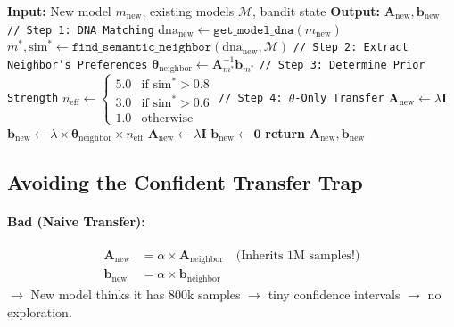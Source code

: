 \documentclass[sigconf]{acmart}
\begin{document}
\begin{algorithm}[h]
\caption{Layer 2: Semantic Transfer}
\label{alg:semantic_transfer}
\begin{algorithmic}[1]
\STATE \textbf{Input:} New model $m_{\text{new}}$, existing models $\mathcal{M}$, bandit state
\STATE \textbf{Output:} $\mathbf{A}_{\text{new}}, \mathbf{b}_{\text{new}}$
\STATE
\STATE \texttt{// Step 1: DNA Matching}
\STATE $\text{dna}_{\text{new}} \leftarrow \texttt{get\_model\_dna}(m_{\text{new}})$
\STATE $m^*, \text{sim}^* \leftarrow \texttt{find\_semantic\_neighbor}(\text{dna}_{\text{new}}, \mathcal{M})$
\STATE
{} 
    \STATE \texttt{// Step 2: Extract Neighbor's Preferences}
    \STATE $\boldsymbol{\theta}_{\text{neighbor}} \leftarrow \mathbf{A}_{m^*}^{-1} \mathbf{b}_{m^*}$
    \STATE
    \STATE \texttt{// Step 3: Determine Prior Strength}
    \STATE $n_{\text{eff}} \leftarrow \begin{cases}
        5.0 & \text{if } \text{sim}^* > 0.8 \\
        3.0 & \text{if } \text{sim}^* > 0.6 \\
        1.0 & \text{otherwise}
    \end{cases}$
    \STATE
    \STATE \texttt{// Step 4: $\theta$-Only Transfer}
    \STATE $\mathbf{A}_{\text{new}} \leftarrow \lambda \mathbf{I}$ 
    \STATE $\mathbf{b}_{\text{new}} \leftarrow \lambda \times \boldsymbol{\theta}_{\text{neighbor}} \times n_{\text{eff}}$ 
\ELSE
    \STATE $\mathbf{A}_{\text{new}} \leftarrow \lambda \mathbf{I}$ 
    \STATE $\mathbf{b}_{\text{new}} \leftarrow \mathbf{0}$ 
\ENDIF
\STATE
\STATE \textbf{return} $\mathbf{A}_{\text{new}}, \mathbf{b}_{\text{new}}$
\end{algorithmic}
\end{algorithm}

\subsection{Avoiding the Confident Transfer Trap}

\paragraph{Bad (Naive Transfer):}
\begin{align}
\mathbf{A}_{\text{new}} &= \alpha \times \mathbf{A}_{\text{neighbor}} \quad \text{(Inherits 1M samples!)} \\
\mathbf{b}_{\text{new}} &= \alpha \times \mathbf{b}_{\text{neighbor}}
\end{align}
$\rightarrow$ New model thinks it has 800k samples $\rightarrow$ tiny confidence intervals $\rightarrow$ no exploration.
\end{document}

